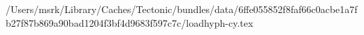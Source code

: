 /Users/msrk/Library/Caches/Tectonic/bundles/data/6ffe055852f8faf66c0acbe1a7fb27f87b869a90bad1204f3bf4d9683f597c7c/loadhyph-cy.tex